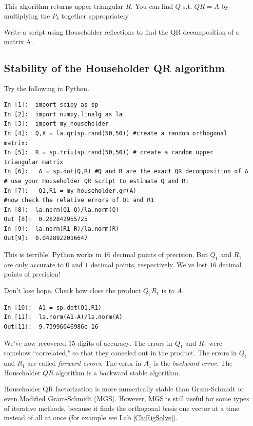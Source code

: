 This algorithm returns upper triangular $R$. You can find $Q$ s.t. $QR = A$ by multiplying the $P_k$ together appropriately.

\begin{problem}
\label{prob:HouseholderQR}
Write a script using Householder reflections to find the QR decomposition of a matrix A.
\end{problem}

\subsection*{Stability of the Householder QR algorithm}

Try the following in Python.

\begin{lstlisting}
In [1]:  import scipy as sp
In [2]:  import numpy.linalg as la
In [3]:  import my_householder
In [4]:  Q,X = la.qr(sp.rand(50,50)) #create a random orthogonal matrix:
In [5]:  R = sp.triu(sp.rand(50,50)) # create a random upper triangular matrix
In [6]:   A = sp.dot(Q,R) #Q and R are the exact QR decomposition of A
# use your Householder QR script to estimate Q and R:
In [7]:   Q1,R1 = my_householder.qr(A)
#now check the relative errors of Q1 and R1
In [8]:  la.norm(Q1-Q)/la.norm(Q)
Out [8]:  0.282842955725
In [9]:  la.norm(R1-R)/la.norm(R)
Out[9]:  0.0428922016647
\end{lstlisting}
This is terrible! Python works in $16$ decimal points of precision. But $Q_1$ and $R_1$ are only accurate to $0$ and $1$ decimal points, respectively. We've lost $16$ decimal points of precision!

Don't lose hope. Check how close the product $Q_1 R_1$ is to $A$.
\begin{lstlisting}
In [10]:  A1 = sp.dot(Q1,R1)
In [11]:  la.norm(A1-A)/la.norm(A)
Out[11]:  9.73996046986e-16
\end{lstlisting}
We've now recovered $15$ digits of accuracy. The errors in $Q_1$ and $R_1$ were somehow ``correlated," so that they canceled out in the product. The errors in $Q_1$ and $R_1$ are called \emph{forward errors}. The error in $A_1$ is the \emph{backward error}. The Householder $QR$ algorithm is a backward stable algorithm.

Householder QR factorization is more numerically stable than Gram-Schmidt or even Modified Gram-Schmidt (MGS). However, MGS is still useful for some types of iterative methods, because it finds the orthogonal basis one vector at a time instead of all at once (for example see Lab \ref{Ch:EigSolve}).

